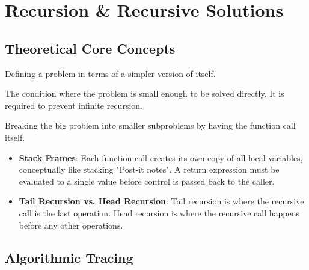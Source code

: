 \chapter{Recursion \& Recursive Solutions}

\section{Theoretical Core Concepts}

\begin{definition}[Recursion]
Defining a problem in terms of a simpler version of itself.
\end{definition}

\begin{definition}
The condition where the problem is small enough to be solved directly. It is required to prevent infinite recursion.
\end{definition}

\begin{definition}
Breaking the big problem into smaller subproblems by having the function call itself.
\end{definition}

\begin{itemize}
    \item \textbf{Stack Frames}: Each function call creates its own copy of all local variables, conceptually like stacking "Post-it notes". A return expression must be evaluated to a single value before control is passed back to the caller. 
    \item \textbf{Tail Recursion vs. Head Recursion}: Tail recursion is where the recursive call is the last operation. Head recursion is where the recursive call happens before any other operations.
\end{itemize}

\section{Algorithmic Tracing}

